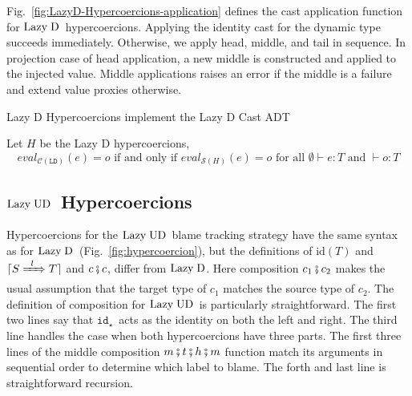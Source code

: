 \documentclass[runningheads]{llncs}
\newcommand{\figref}[1]{Fig.~\ref{#1}}
\newcommand{\LUD}{\ensuremath{\text{Lazy\;UD}}}
\newcommand{\LD}{\ensuremath{\text{Lazy\;D}}}
\newcommand{\CMachine}[1]{\ensuremath{\mathcal{C}(#1)}}
\newcommand{\LDMachine}{\CMachine{\BLD}}
\newcommand{\SMachine}[1]{\ensuremath{\mathcal{S}(#1)}}
\newcommand{\Tdyn}[0]{\ensuremath{\star}}
\newcommand{\ccast}[3]{#1 \xRightarrow[]{\enskip #2 \enskip} #3}
\newcommand{\BLD}[0]{\ensuremath{\mathtt{LD}}}
\newcommand{\cnfid}[1]{\ensuremath{\mathtt{id}_{#1}}}
\newcommand{\hcci}[0]{\cnfid{\Tdyn}}
\newcommand{\compose}[2]{\ensuremath{#1 \fatsemi #2}}
\newcommand{\translate}[1]{\ensuremath{\lceil#1\rceil}}
\newcommand{\id}[1]{\ensuremath{\mathrm{id}(#1)}}
\newcommand{\expressiontyping}[3]{\ensuremath{#1 \vdash #2 : #3}}
\newcommand{\valuetyping}[2]{\ensuremath{\vdash #1 : #2}}
\newcommand{\withmachineevalto}[3]{\ensuremath{\mathit{eval}_{#1}(#2)=#3}}
\newcommand{\compatibletailhead}[2]{\ensuremath{#1\;\mathit{R}\;#2}}
\newcommand{\machineequiv}[2]{
	\ensuremath{
		\withmachineevalto{#1}{e}{o}	
		\text{ if and only if }
		\withmachineevalto{#2}{e}{o}
		\text{ for all }
		\expressiontyping{\emptyset}{e}{T}
		\text{ and }
		\valuetyping{o}{T}
	}}
\begin{document}
Fig.~\ref{fig:LazyD-Hypercoercions-application} defines the cast application 
function for \LD\ hypercoercions.
Applying the identity cast for the dynamic type succeeds immediately. 
Otherwise, we apply head, middle, and tail in sequence. 
%
In projection case of head application, a new middle is constructed and applied 
to the injected value.
%
Middle applications raises an error if the middle is a failure and extend value 
proxies otherwise.

\begin{proposition} Lazy D Hypercoercions implement the Lazy D Cast ADT
\end{proposition}
\begin{theorem} Let $H$ be the Lazy D 
hypercoercions,
\[\machineequiv{\LDMachine}{\SMachine{H}}\]
\end{theorem}


\subsection{\LUD\ Hypercoercions} \label{sec:LazyUD-Hypercoercions}

Hypercoercions for the \LUD\ blame tracking strategy have the same syntax
as for \LD\ (\figref{fig:hypercoercion}), but the definitions of $\id{T}$ and
$\translate{\ccast{S}{l}{T}}$ and $\compose{c}{c}$, differ from \LD. Here 
composition $\compose{c_1}{c_2}$ makes the usual assumption that the
target type of $c_1$ matches the source type of $c_2$. 
%
The definition of composition for \LUD\ is particularly straightforward.
The first two lines say that \hcci\ acts as the identity on both the left
and right.
The third line handles the case when both hypercoercions have three parts. 
%
The first three lines of the middle composition $m \fatsemi t \fatsemi h 
\fatsemi m$ function match its arguments in sequential order to determine which 
label to blame. The forth and last line is straightforward recursion.

\todo[inline]{KC: I need a better name for \compatibletailhead{t}{h}}

\end{document}
